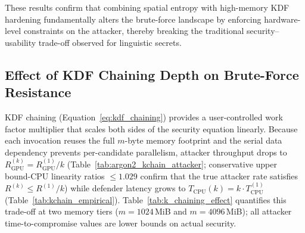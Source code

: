 \documentclass[mathematics,article,accept,pdftex,moreauthors]{Definitions/mdpi}
\begin{document}
\clearpage
These results confirm that combining spatial entropy with high-memory KDF hardening fundamentally alters the brute-force landscape by enforcing hardware-level constraints on the attacker, thereby breaking the traditional security–usability trade-off observed for linguistic secrets.

\subsection{Effect of KDF Chaining Depth on Brute-Force Resistance}
\label{sec:kchain_analysis}
\label{sec:kchain_spectrum}

{KDF chaining (Equation~\eqref{eq:kdf_chaining}) provides a user-controlled work factor multiplier that scales both sides of the security equation linearly. Because each invocation reuses the full $m$-byte memory footprint and the serial data dependency prevents per-candidate parallelism, attacker throughput drops to $R_\text{GPU}^{(k)} = R_\text{GPU}^{(1)} / k$ (Table~\ref{tab:argon2_kchain_attacker}; conservative upper bound-CPU linearity ratios $\leq 1.029$ confirm that the true attacker rate satisfies $R^{(k)} \leq R^{(1)}/k$) while defender latency grows to $T_\text{CPU}(k) = k \cdot T_\text{CPU}^{(1)}$ (Table~\ref{tab:kchain_empirical}). Table~\ref{tab:k_chaining_effect} quantifies this trade-off at two memory tiers ($m=1024$\,MiB and $m=4096$\,MiB); all attacker time-to-compromise values are lower bounds on actual security.}
\end{document}
